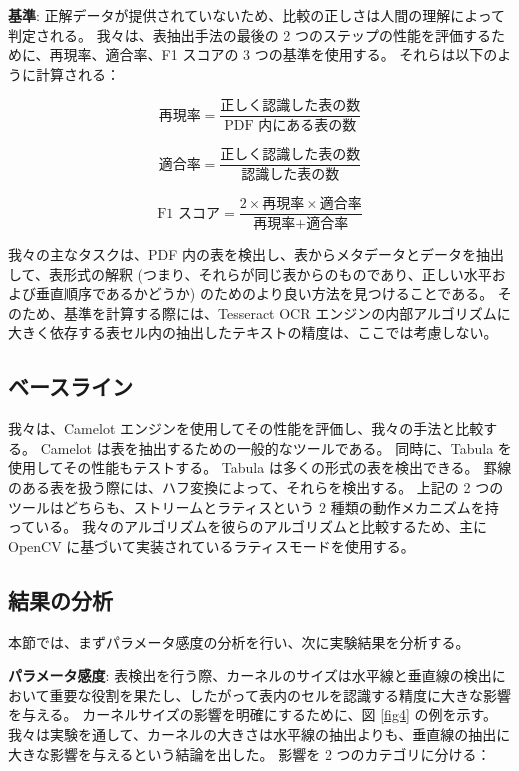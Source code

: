 \documentclass[uplatex, twocolumn,10pt]{jsarticle}
\begin{document}
\textbf{基準}:
正解データが提供されていないため、比較の正しさは人間の理解によって判定される。
我々は、表抽出手法の最後の 2 つのステップの性能を評価するために、再現率、適合率、F1 スコアの 3 つの基準を使用する。
それらは以下のように計算される：

\begin{equation}
    \text{再現率} = \frac{\text{正しく認識した表の数}}{\text{PDF 内にある表の数}}
\end{equation}

\begin{equation}
    \text{適合率} = \frac{\text{正しく認識した表の数}}{\text{認識した表の数}}
\end{equation}

\begin{equation}
    \text{F1 スコア} = \frac{2 \times \text{再現率} \times \text{適合率}}{\text{再現率} + \text{適合率}}
\end{equation}

我々の主なタスクは、PDF 内の表を検出し、表からメタデータとデータを抽出して、表形式の解釈 (つまり、それらが同じ表からのものであり、正しい水平および垂直順序であるかどうか) のためのより良い方法を見つけることである。
そのため、基準を計算する際には、Tesseract OCR エンジンの内部アルゴリズムに大きく依存する表セル内の抽出したテキストの精度は、ここでは考慮しない。

\subsection{ベースライン}
我々は、Camelot エンジンを使用してその性能を評価し、我々の手法と比較する。
Camelot は表を抽出するための一般的なツールである。
同時に、Tabula を使用してその性能もテストする。
Tabula は多くの形式の表を検出できる。
罫線のある表を扱う際には、ハフ変換によって、それらを検出する。
上記の 2 つのツールはどちらも、ストリームとラティスという 2 種類の動作メカニズムを持っている。
我々のアルゴリズムを彼らのアルゴリズムと比較するため、主に OpenCV に基づいて実装されているラティスモードを使用する。

\subsection{結果の分析}
本節では、まずパラメータ感度の分析を行い、次に実験結果を分析する。

\textbf{パラメータ感度}:
表検出を行う際、カーネルのサイズは水平線と垂直線の検出において重要な役割を果たし、したがって表内のセルを認識する精度に大きな影響を与える。
カーネルサイズの影響を明確にするために、図 \ref{fig4} の例を示す。
我々は実験を通して、カーネルの大きさは水平線の抽出よりも、垂直線の抽出に大きな影響を与えるという結論を出した。
影響を 2 つのカテゴリに分ける：
\end{document}
